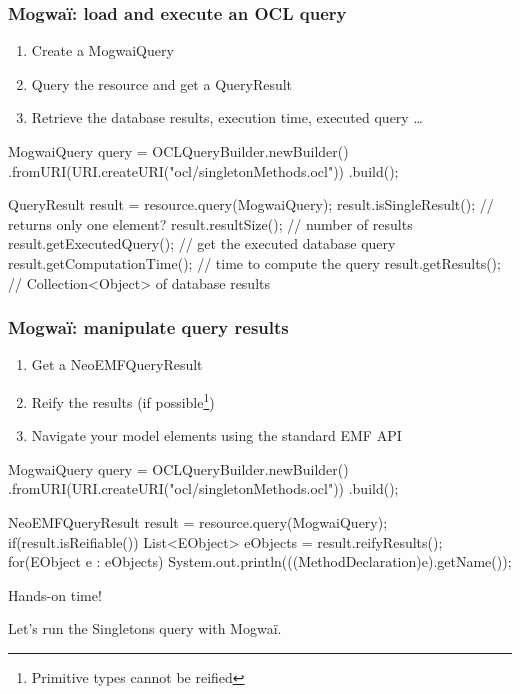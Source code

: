 \begin{frame}[fragile]\frametitle{Mogwa\"i: load and execute an OCL query}
\begin{enumerate}
\item Create a MogwaiQuery
\item Query the resource and get a QueryResult
\item Retrieve the database results, execution time, executed query \ldots
\end{enumerate}
\begin{java}
MogwaiQuery query = OCLQueryBuilder.newBuilder()
	.fromURI(URI.createURI("ocl/singletonMethods.ocl"))
	.build();
	
QueryResult result = resource.query(MogwaiQuery);
result.isSingleResult(); // returns only one element?
result.resultSize(); // number of results
result.getExecutedQuery(); // get the executed database query
result.getComputationTime(); // time to compute the query
result.getResults(); // Collection<Object> of database results
\end{java}
\end{frame}

\begin{frame}[fragile]\frametitle{Mogwa\"i: manipulate query results}
\begin{enumerate}
\item Get a NeoEMFQueryResult
\item Reify the results (if possible\footnote{Primitive types cannot be reified})
\item Navigate your model elements using the standard EMF API
\end{enumerate}
\begin{java}
MogwaiQuery query = OCLQueryBuilder.newBuilder()
	.fromURI(URI.createURI("ocl/singletonMethods.ocl"))
	.build();
	
NeoEMFQueryResult result = resource.query(MogwaiQuery);
if(result.isReifiable()) {
	List<EObject> eObjects = result.reifyResults();
	for(EObject e : eObjects) {
		System.out.println(((MethodDeclaration)e).getName());
	}
}
\end{java}
\end{frame}

\begin{frame}[standout]
  Hands-on time!

  Let's run the Singletons query with Mogwa\"i.
\end{frame}

